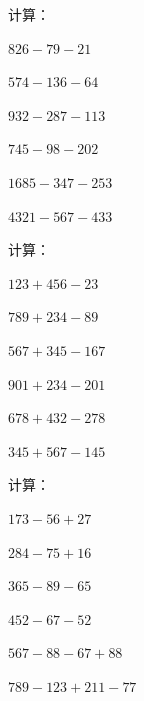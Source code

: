 \documentclass[a4paper,12pt]{ctexart}
\begin{document}
\begin{exercise}
\item 计算：
  \begin{subexercise}
    \item $826-79-21$
    \item $574-136-64$
    \item $932-287-113$
    \item $745-98-202$
    \item $1685-347-253$
    \item $4321-567-433$
  \end{subexercise}

\item 计算：
  \begin{subexercise}
    \item $123+456-23$
    \item $789+234-89$
    \item $567+345-167$
    \item $901+234-201$
    \item $678+432-278$
    \item $345+567-145$
  \end{subexercise}

\item 计算：
  \begin{subexercise}
    \item $173-56+27$
    \item $284-75+16$
    \item $365-89-65$
    \item $452-67-52$
    \item $567-88-67+88$
    \item $789-123+211-77$
  \end{subexercise}
\end{exercise}

\newpage



\bigskip
\end{document}
